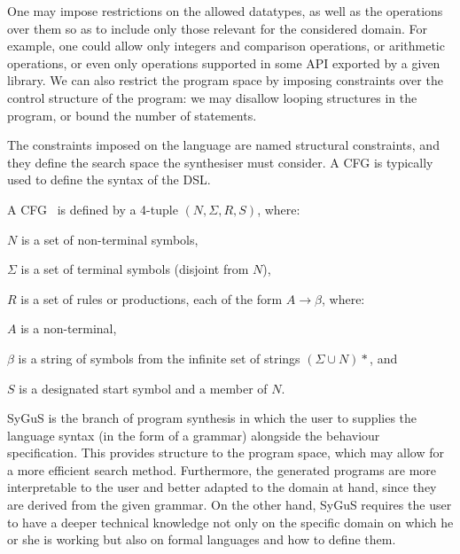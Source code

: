 One may impose restrictions on the allowed datatypes, as well as the operations over them so as to include only those relevant for the considered domain. For example, one could allow only integers and comparison operations, or arithmetic operations, or even only operations supported in some API exported by a given library. We can also restrict the program space by imposing constraints over the control structure of the program: we may disallow looping structures in the program, or bound the number of statements.

The constraints imposed on the language are named structural constraints, and they define the search space the synthesiser must consider. A \ac{CFG} is typically used to define the syntax of the \ac{DSL}.

\begin{definition}
A \acl{CFG}~\cite{Jurafsky} is defined by a 4-tuple \((N, \Sigma, R, S)\), where:

\(N\) is a set of non-terminal symbols,

\(\Sigma\) is a set of terminal symbols (disjoint from \(N\)),

\(R\) is a set of rules or productions, each of the form \(A \to \beta\), where:

\quad \(A\) is a non-terminal,

\quad \(\beta\) is a string of symbols from the infinite set of strings \((\Sigma \cup N)*\), and

\(S\) is a designated start symbol and a member of \(N\).
\end{definition}


\acf{SyGuS} \cite{DBLP:conf/fmcad/AlurBJMRSSSTU13} is the branch of program synthesis in which the user to supplies the language syntax (in the form of a grammar) alongside the behaviour specification. This provides structure to the program space, which may allow for a more efficient search method. Furthermore, the generated programs are more interpretable to the user and better adapted to the domain at hand, since they are derived from the given grammar. On the other hand, \ac{SyGuS} requires the user to have a deeper technical knowledge not only on the specific domain on which he or she is working but also on formal languages and how to define them.


